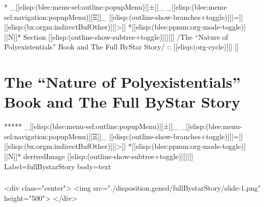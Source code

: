 \begin{whenOrg}
\begin{verblatex}
\begin{frame}[fragile,label=part_polyexistentialsBook]
    \tableofcontents

\end{frame}
\end{verblatex}



\begin{whenOrg}
*  _[[elisp:(blee:menu-sel:outline:popupMenu)][±]]_ _[[elisp:(blee:menu-sel:navigation:popupMenu)][Ξ]]_ [[elisp:(outline-show-branches+toggle)][|=]] [[elisp:(bx:orgm:indirectBufOther)][|>]] *[[elisp:(blee:ppmm:org-mode-toggle)][|N]]*  Section    [[elisp:(outline-show-subtree+toggle)][||]]   /The ``Nature of Polyexistentials'' Book and The Full ByStar Story/ ::  [[elisp:(org-cycle)][| ]]
\end{whenOrg}

\section{The ``Nature of Polyexistentials'' Book and The Full ByStar Story}



\begin{whenOrg}
*****  _[[elisp:(blee:menu-sel:outline:popupMenu)][±]]_ _[[elisp:(blee:menu-sel:navigation:popupMenu)][Ξ]]_ [[elisp:(outline-show-branches+toggle)][|=]] [[elisp:(bx:orgm:indirectBufOther)][|>]] *[[elisp:(blee:ppmm:org-mode-toggle)][|N]]*  derivedImage [[elisp:(outline-show-subtree+toggle)][||]] Label=fullBystarStory  body=text
\end{whenOrg}

\begin{htmlonly}

\begin{frame}[fragile,plain,label=fullBystarStory]
    \frametitle{}
    \framesubtitle{}
    \begin{rawhtml}
<div class="center">
<img src="./disposition.gened/fullBystarStory/slide-1.png" height="500">
</div>
    \end{rawhtml}
\end{frame}
\end{htmlonly}


\end{whenOrg}
